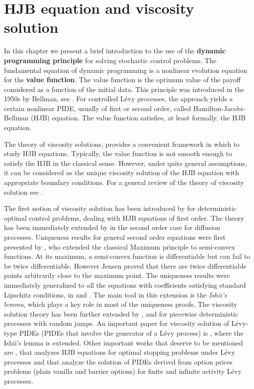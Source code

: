 

\chapter{HJB equation and viscosity solution}\label{Chapter4}
\minitoc%

\vspace{5em}

In this chapter we present a brief introduction to the use of the \textbf{dynamic programming principle} for solving stochastic control problems. 
The fundamental equation of dynamic programming is a nonlinear evolution equation for the \textbf{value function}.
The value function is the optimum value of the payoff considered as a function of the initial data.
This principle was introduced in the 1950s by Bellman, see \cite{Bellman}. 
For controlled Lévy processes,
the approach yields a certain nonlinear PIDE, usually of first or second order, called Hamilton-Jacobi-Bellman (HJB) equation. The value function satisfies, at least formally,
the HJB equation.

The theory of viscosity solutions, provides a convenient framework in which to study HJB equations.
Typically, the value function is not smooth enough to satisfy the HJB in the classical sense. However, under quite general assumptions, it can be considered as the unique viscosity
solution of the HJB equation with appropriate boundary conditions. For a general review of the theory of viscosity solution see \cite{CIL92}.

The first notion of viscosity solution has been introduced by \cite{CL83} for deterministic optimal control problems, dealing with HJB equations of first order. The theory has
been immediately extended by \cite{PLL83} in the second order case for diffusion processes.
Uniqueness results for general second order equations were first presented by \cite{Je88}, who extended the classical Maximum principle to semi-convex functions. 
At its maximum, a semi-convex function is differentiable but can fail to be twice differentiable. However Jensen proved that there are twice differentiable points arbitrarily close
to the maximum point.
The uniqueness results were immediately generalized to all the equations with coefficients satisfying standard Lipschitz conditions,
in \cite{Is89} and \cite{IsLi90}. The main tool in this extension is the \emph{Ishii's lemma}, which plays a key role in most of the uniqueness proofs.
The viscosity solution theory has been further extended by \cite{Soner86}, \cite{Soner86b} and \cite{Sayah91} for piecewise deterministic processes with random jumps.
An important paper for viscosity solution of Lévy-type PIDEs (PIDEs that involve the generator of a Lévy process) is \cite{BaIm08}, where the Ishii's
lemma is extended. 
Other important works that deserve to be mentioned are \cite{Ph98}, that analyzes HJB equations for optimal stopping problems under Lévy processes and \cite{CoVo05} that analyze
the solution of PIDEs derived from option prices problems (plain vanilla and barrier options) for finite and infinite activity Lévy processes.
\vspace{1em}

